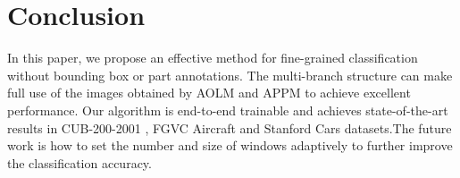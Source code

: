 \documentclass[runningheads]{llncs}
\begin{document}
\section{Conclusion}
In this paper, we propose an effective method for fine-grained classification without bounding box or part annotations. The multi-branch structure can make full use of the images obtained by AOLM and APPM to achieve excellent performance. Our algorithm is end-to-end trainable and achieves state-of-the-art results in CUB-200-2001 \cite{WahCUB_200_2011}, FGVC Aircraft \cite{maji2013fine} and Stanford Cars \cite{KrauseStarkDengFei-Fei_3DRR2013}  datasets.The future work is how to set the number and size of windows adaptively to further improve the classification accuracy. \\






\end{document}
